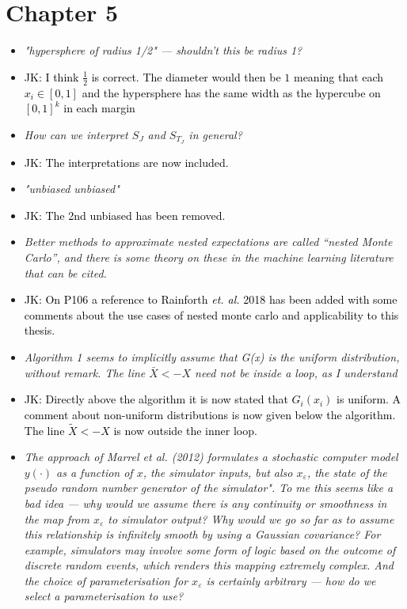\documentclass[12pt]{article}
\newcommand{\done}[2]{\item[#1]\textit{#2}}
\newcommand{\jack}[1]{\item{\textcolor{black}{JK: #1}}}
\begin{document}
\section{Chapter 5}
\begin{itemize}
\done{P98}{"hypersphere of radius 1/2" --- shouldn’t this be radius 1?}

\jack{I think $\frac12$ is correct. The diameter would then be $1$ meaning that each $x_i \in [0,  1]$ and the hypersphere has the same width as the hypercube on $[0,1]^k$ in each margin}

\done{P102}{How can we interpret $S_J$ and $S_{T_J}$ in general?}

\jack{The interpretations are now included.}

\done{P104}{"unbiased unbiased"}

\jack{The 2nd unbiased has been removed.}

\done{P105}{Better methods to approximate nested expectations are called ``nested Monte Carlo'', and there is some theory on these in the machine learning literature that can be cited.}

\jack{On P106 a reference to Rainforth \textit{et. al.} 2018 has been added with some comments about the use cases of nested monte carlo and applicability to this thesis.}

\done{P106}{Algorithm 1 seems to implicitly assume that G(x) is the uniform distribution, without remark.  The line $\bar{X} <- X$ need not be inside a loop, as I understand }

\jack{Directly above the algorithm it is now stated that $G_i(x_i)$ is uniform. A comment about non-uniform distributions is now given below the algorithm. The line $\tilde{X} <- X$ is now outside the inner loop.}

\done{P106}{The approach of Marrel et al. (2012) formulates a stochastic computer model $y(·)$ as a function of $x$, the simulator inputs, but also $x_\varepsilon$, the state of the pseudo random number generator of the simulator".  To me this seems like a bad idea --- why would we assume there is any continuity or smoothness in the map from $x_\varepsilon$ to simulator output? Why would we go so far as to assume this relationship is infinitely smooth by using a Gaussian covariance?  For example, simulators may involve some form of logic based on the outcome of discrete random events, which renders this mapping extremely complex.  And the choice of parameterisation for $x_\varepsilon$ is certainly arbitrary --- how do we select a parameterisation to use?}


\end{itemize}
\end{document}
